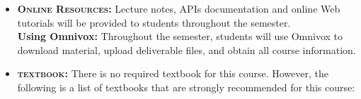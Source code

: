 \documentclass[11pt, a4paper]{article}
\begin{document}
\begin{itemize}[itemsep=4pt,parsep=0pt,topsep=1pt,partopsep=1pt]
	\item[\color{darkblue}\faNewspaperO] \textbf{\textsc{Online Resources:}}
	Lecture notes, APIs documentation and online Web tutorials will be provided to students throughout the semester.  \\
	\noindent \textbf{Using Omnivox:} Throughout the semester, students will use Omnivox to download material, upload deliverable files, and obtain all course information.
		
	\item[\color{darkblue}\faBook] \textbf{\textsc{textbook:}} There is no required textbook for this course. However, the following is a list of textbooks that are strongly recommended for this course:\\
\end{itemize}
\end{document}
